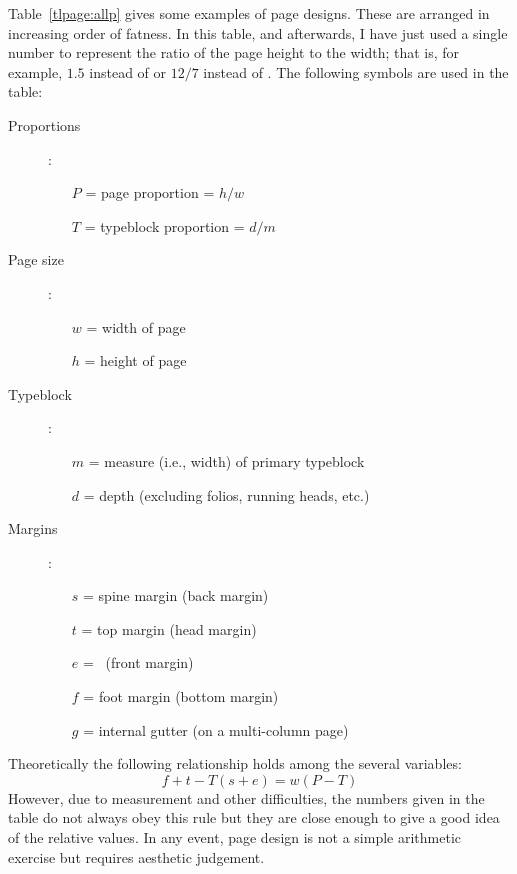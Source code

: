 \documentclass[10pt,a4paper,oneside,extrafontsizes]{memoir}%
\begin{document}
\begin{paracol}{2}
\switchEng
  Table~\ref{tlpage:allp} gives some examples of 
page designs. These are arranged in increasing order of
fatness. In this table, and afterwards, I have just used a single number
to represent the ratio of the page height to the width; that is, for example,
$1.5$ instead of  or $12/7$ instead of .
The following symbols are used in the table:
\begin{description}
\item[Proportions]:
  \begin{itemize}
  \item[$P$] = page proportion = $h/w$
  \item[$T$] = typeblock proportion = $d/m$
  \end{itemize}
\item[Page size]:
  \begin{itemize}
  \item[$w$] = width of page
  \item[$h$] = height of page
  \end{itemize}
\item[Typeblock]:
  \begin{itemize}
  \item[$m$] = measure (i.e., width) of primary typeblock
  \item[$d$] = depth (excluding folios, running heads, etc.)
  \end{itemize}
\item[Margins]:
  \begin{itemize}
  \item[$s$] = spine margin (back margin)
  \item[$t$] = top margin (head margin)
  \item[$e$] = \foredge\ (front margin)
  \item[$f$] = foot margin (bottom margin)
  \item[$g$] = internal gutter (on a multi-column page)
  \end{itemize}
\end{description}

    Theoretically the following relationship holds among the several
variables:
\begin{displaymath}
f + t - T(s + e) = w(P - T)
\end{displaymath}
However, due to measurement and other difficulties, the numbers given in 
the table do not always obey this rule but they are close enough to give
a good idea of the relative values. In any event, page design is not a
simple arithmetic exercise but requires aesthetic judgement.


\end{paracol}
\end{document}
